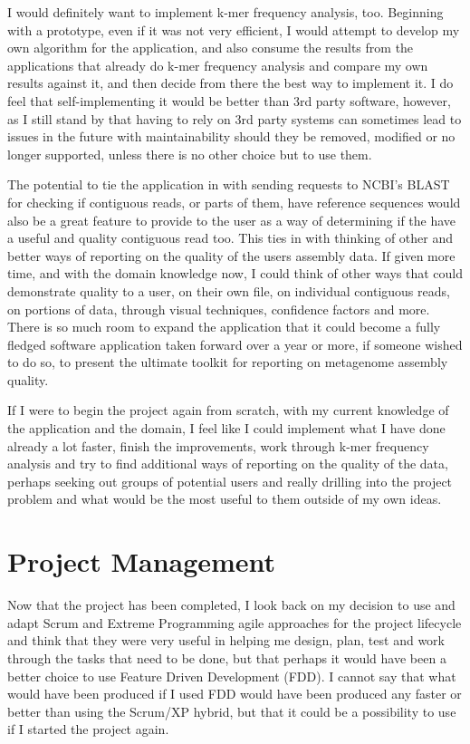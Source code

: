 I would definitely want to implement k-mer frequency analysis, too. Beginning with a prototype, even if it was not very efficient, I would attempt to develop my own algorithm for the application, and also consume the results from the applications that already do k-mer frequency analysis and compare my own results against it, and then decide from there the best way to implement it. I do feel that self-implementing it would be better than 3rd party software, however, as I still stand by that having to rely on 3rd party systems can sometimes lead to issues in the future with maintainability should they be removed, modified or no longer supported, unless there is no other choice but to use them.

The potential to tie the application in with sending requests to NCBI's BLAST for checking if contiguous reads, or parts of them, have reference sequences would also be a great feature to provide to the user as a way of determining if the have a useful and quality contiguous read too. This ties in with thinking of other and better ways of reporting on the quality of the users assembly data. If given more time, and with the domain knowledge now, I could think of other ways that could demonstrate quality to a user, on their own file, on individual contiguous reads, on portions of data, through visual techniques, confidence factors and more. There is so much room to expand the application that it could become a fully fledged software application taken forward over a year or more, if someone wished to do so, to present the ultimate toolkit for reporting on metagenome assembly quality.

If I were to begin the project again from scratch, with my current knowledge of the application and the domain, I feel like I could implement what I have done already a lot faster, finish the improvements, work through k-mer frequency analysis and try to find additional ways of reporting on the quality of the data, perhaps seeking out groups of potential users and really drilling into the project problem and what would be the most useful to them outside of my own ideas.

\section{Project Management}
Now that the project has been completed, I look back on my decision to use and adapt Scrum and Extreme Programming agile approaches for the project lifecycle and think that they were very useful in helping me design, plan, test and work through the tasks that need to be done, but that perhaps it would have been a better choice to use Feature Driven Development (FDD). I cannot say that what would have been produced if I used FDD would have been produced any faster or better than using the Scrum/XP hybrid, but that it could be a possibility to use if I started the project again.

